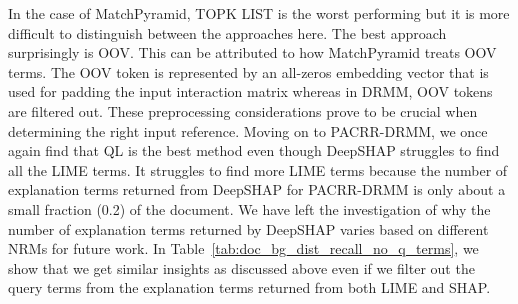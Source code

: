 In the case of MatchPyramid, TOPK LIST is the worst performing but it is more difficult to distinguish between the approaches here. The best approach surprisingly is OOV. This can be attributed to how MatchPyramid treats OOV terms. The OOV token is represented by an all-zeros embedding vector that is used for padding the input interaction matrix whereas in DRMM, OOV tokens are filtered out. These preprocessing considerations prove to be crucial when determining the right input reference. Moving on to PACRR-DRMM, we once again find that QL is the best method even though DeepSHAP struggles to find all the LIME terms. It struggles to find more LIME terms because the number of explanation terms returned from DeepSHAP for PACRR-DRMM is only about a small fraction (0.2) of the document. We have left the investigation of why the number of explanation terms returned by DeepSHAP varies based on different NRMs for future work. In Table~\ref{tab:doc_bg_dist_recall_no_q_terms}, we show that we get similar insights as discussed above even if we filter out the query terms from the explanation terms returned from both LIME and SHAP.

